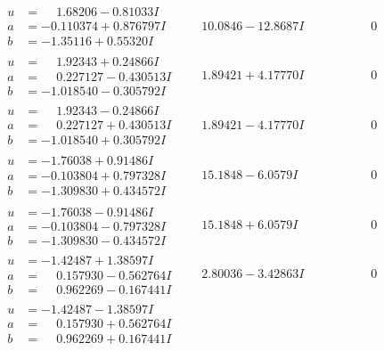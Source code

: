 \documentclass[1p]{elsarticle_modified}
\theoremstyle{definition}
\begin{document}
$$\begin{array}{c|c|c}
\begin{aligned}
u &= \phantom{-}1.68206 - 0.81033 I \\
a &= -0.110374 + 0.876797 I \\
b &= -1.35116 + 0.55320 I\end{aligned}
 & \phantom{-}10.0846 - 12.8687 I & \phantom{-0.000000 } 0 \\ \hline\begin{aligned}
u &= \phantom{-}1.92343 + 0.24866 I \\
a &= \phantom{-}0.227127 - 0.430513 I \\
b &= -1.018540 - 0.305792 I\end{aligned}
 & \phantom{-}1.89421 + 4.17770 I & \phantom{-0.000000 } 0 \\ \hline\begin{aligned}
u &= \phantom{-}1.92343 - 0.24866 I \\
a &= \phantom{-}0.227127 + 0.430513 I \\
b &= -1.018540 + 0.305792 I\end{aligned}
 & \phantom{-}1.89421 - 4.17770 I & \phantom{-0.000000 } 0 \\ \hline\begin{aligned}
u &= -1.76038 + 0.91486 I \\
a &= -0.103804 + 0.797328 I \\
b &= -1.309830 + 0.434572 I\end{aligned}
 & \phantom{-}15.1848 - 6.0579 I & \phantom{-0.000000 } 0 \\ \hline\begin{aligned}
u &= -1.76038 - 0.91486 I \\
a &= -0.103804 - 0.797328 I \\
b &= -1.309830 - 0.434572 I\end{aligned}
 & \phantom{-}15.1848 + 6.0579 I & \phantom{-0.000000 } 0 \\ \hline\begin{aligned}
u &= -1.42487 + 1.38597 I \\
a &= \phantom{-}0.157930 - 0.562764 I \\
b &= \phantom{-}0.962269 - 0.167441 I\end{aligned}
 & \phantom{-}2.80036 - 3.42863 I & \phantom{-0.000000 } 0 \\ \hline\begin{aligned}
u &= -1.42487 - 1.38597 I \\
a &= \phantom{-}0.157930 + 0.562764 I \\
b &= \phantom{-}0.962269 + 0.167441 I\end{aligned}

\end{array}$$
\end{document}

